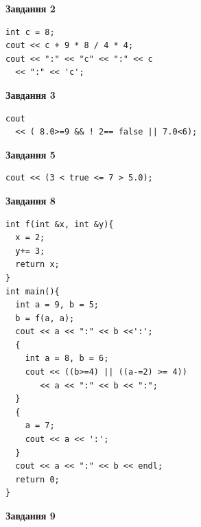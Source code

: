 \documentclass[12pt, ukrainian]{article}
\begin{document}
{\begin {large}
\begin{minipage}[t]{7.0cm}
\end{minipage}
\vline \hspace{1mm}
\begin{minipage}[t]{11.0cm}

\begin{center}
\textbf{Завдання 2}
\end{center}
\vspace{-8mm}

\begin{verbatim}
int c = 8;
cout << c + 9 * 8 / 4 * 4;
cout << ":" << "c" << ":" << c 
  << ":" << 'c';
\end{verbatim}



\begin{center}
\textbf{Завдання 3}
\end{center}
\vspace{-8mm}

\begin{verbatim}
cout 
  << ( 8.0>=9 && ! 2== false || 7.0<6);
\end{verbatim}



\begin{center}
\textbf{Завдання 5}
\end{center}
\vspace{-8mm}

\begin{verbatim}
cout << (3 < true <= 7 > 5.0);
\end{verbatim}



\begin{center}
\textbf{Завдання 8}
\end{center}
\vspace{-8mm}

\begin{verbatim}
int f(int &x, int &y){
  x = 2;
  y+= 3;
  return x;
}
int main(){
  int a = 9, b = 5;
  b = f(a, a);
  cout << a << ":" << b <<':';
  {
    int a = 8, b = 6;
    cout << ((b>=4) || ((a-=2) >= 4))
       << a << ":" << b << ":";
  }
  {
    a = 7;
    cout << a << ':';
  }
  cout << a << ":" << b << endl;
  return 0;
}
\end{verbatim}

\end{minipage}


\begin{minipage}[t]{7.0cm}

\begin{center}
\textbf{Завдання 9}
\end{center}
\vspace{-8mm}


\end{minipage}
\end{large}}
\end{document}
